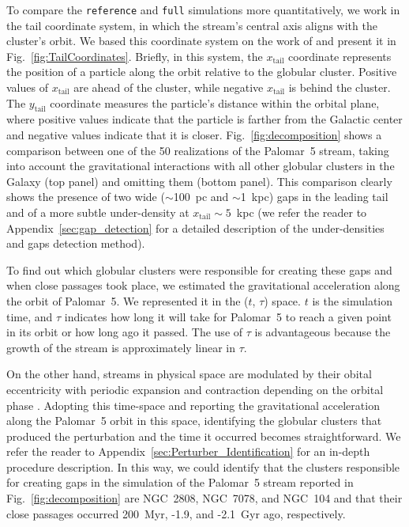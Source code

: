 \documentclass{aa}
\begin{document}
    To compare the \texttt{reference} and \texttt{full} simulations more quantitatively, we work in the tail coordinate system, in which the stream's central axis aligns with the cluster's orbit. We based this coordinate system on the work of \citet{2004AJ....127.2753D} and present it in Fig.~\ref{fig:TailCoordinates}. Briefly, in this system, the $x_{\textrm{tail}}$ coordinate represents the position of a particle along the orbit relative to the globular cluster. Positive values of $x_{\textrm{tail}}$ are ahead of the cluster, while negative $x_{\textrm{tail}}$ is behind the cluster. The $y_{\textrm{tail}}$ coordinate measures the particle's distance within the orbital plane, where positive values indicate that the particle is farther from the Galactic center and negative values indicate that it is closer. Fig.~\ref{fig:decomposition} shows a comparison between one of the 50 realizations of the Palomar~5 stream, taking into account the gravitational interactions with all other globular clusters in the Galaxy (top panel) and omitting them (bottom panel). This comparison clearly shows the presence of two wide ($\sim$100~pc and $\sim$1~kpc) gaps in the leading tail and of a more subtle under-density at $x_{\textrm{tail}}\sim 5$~kpc (we refer the reader to Appendix~\ref{sec:gap_detection} for a detailed description of the under-densities and gaps detection method). 
    
    To find out which globular clusters were responsible for creating these gaps and when close passages took place, we estimated the gravitational acceleration along the orbit of Palomar~5. We represented it in the ($t$, $\tau$) space. $t$ is the simulation time, and $\tau$ indicates how long it will take for Palomar~5 to reach a given point in its orbit or how long ago it passed. The use of $\tau$ is advantageous because the growth of the stream is approximately linear in $\tau$. 
    
    On the other hand, streams in physical space are modulated by their obital eccentricity with periodic expansion and contraction depending on the orbital phase \citep[see the top panel of Fig.~5.][for an example]{2016MNRAS.457.3817S}. Adopting this time-space and reporting the gravitational acceleration along the Palomar~5 orbit in this space, identifying the globular clusters that produced the perturbation and the time it occurred becomes straightforward. We refer the reader to Appendix~\ref{sec:Perturber_Identification} for an in-depth procedure description. In this way, we could identify that the clusters responsible for creating gaps in the simulation of the Palomar~5 stream reported in Fig.~\ref{fig:decomposition} are NGC~2808, NGC~7078, and NGC~104 and that their close passages occurred 200~Myr, -1.9, and -2.1~Gyr ago, respectively. 
    
\end{document}
